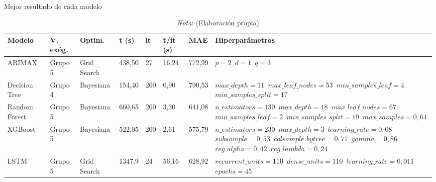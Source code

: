 \documentclass[12pt,a4paper]{report}
\begin{document}
\begin{table}[H]
\centering
\caption{\\ Mejor resultado de cada modelo}
\scriptsize
\begin{tabular}{m{1cm} m{1.2cm} m{1.2cm} m{1cm} m{1cm} m{1.2cm} m{1.2cm} m{3.5cm}} 
\toprule
\textbf{Modelo} & \textbf{V. exóg.} & \textbf{Optim.} & \textbf{t (s)} & \textbf{it} & \textbf{t/it (s)} & \textbf{MAE} & \textbf{Hiperparámetros} \\
\midrule
ARIMAX  & Grupo 5 & Grid Search & 438,50 & 27 & 16,24 & 772,99 & \texttt{$p=2$ \newline $d=1$ \newline $q=3$} \\
\hline
Decision Tree   & Grupo 4 & Bayesiana & 154,40 & 200 & 0,90 & 790,53 & \texttt{$max\_depth=11$ \newline $max\_leaf\_nodes=53$ \newline $min\_samples\_leaf=4$ \newline $min\_samples\_split=17$} \\[0.5em]
\hline
Random Forest   & Grupo 5 & Bayesiana & 660,65  & 200 & 3,30 & 641,08 & \texttt{$n\_estimators=130$ \newline $max\_depth=18$ \newline $max\_leaf\_nodes=67$ \newline $min\_samples\_leaf=2$ \newline $min\_samples\_split=19$ \newline $max\_samples=0,64$} \\
\hline
XGBoost   & Grupo 5 & Bayesiana & 522,05 & 200 & 2,61 & 575,79 & \texttt{$n\_estimators=230$ \newline $max\_depth=3$ \newline $learning\_rate=0,08$ \newline $subsample=0,53$ \newline $colsample\_bytree=0,77$ \newline $gamma=0,86$ \newline $reg\_alpha=0,42$ \newline $reg\_lambda=0,24$} \\
\hline
LSTM   & Grupo 5 & Grid Search & 1347,9 & 24 & 56,16 & 628,92 & \texttt{$recurrent\_units=110$ \newline $dense\_units=110$ \newline $learning\_rate=0,011$ \newline $epochs=45$} \\
\bottomrule
\end{tabular}
\label{tab:resultados_generales}
\caption*{\textit{Nota}: (Elaboración propia)}
\end{table}
\end{document}
